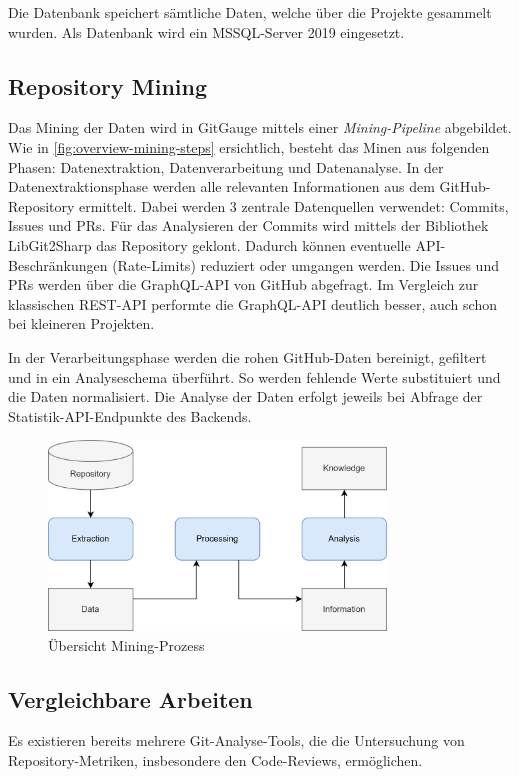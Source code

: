 Die Datenbank speichert sämtliche Daten, welche über die Projekte gesammelt wurden. Als Datenbank wird ein MSSQL-Server 2019 eingesetzt. \parencite{grand_joel_vt1_joelgrand_repository_2024}

\subsection{Repository Mining}
Das Mining der Daten wird in GitGauge mittels einer \textit{Mining-Pipeline} abgebildet. Wie in \autoref{fig:overview-mining-steps} ersichtlich, besteht das Minen aus folgenden Phasen: Datenextraktion, Datenverarbeitung und Datenanalyse. 
In der Datenextraktionsphase werden alle relevanten Informationen aus dem GitHub-Repository ermittelt. Dabei werden 3 zentrale Datenquellen verwendet: Commits, Issues und PRs. Für das Analysieren der Commits wird mittels der Bibliothek LibGit2Sharp das Repository geklont. Dadurch können eventuelle API-Beschränkungen (Rate-Limits) reduziert oder umgangen werden. Die Issues und PRs werden über die GraphQL-API von GitHub abgefragt. Im Vergleich zur klassischen REST-API performte die GraphQL-API deutlich besser, auch schon bei kleineren Projekten.  

In der Verarbeitungsphase werden die rohen GitHub-Daten bereinigt, gefiltert und in ein Analyseschema überführt. So werden fehlende Werte substituiert und die Daten normalisiert. 
Die Analyse der Daten erfolgt jeweils bei Abfrage der Statistik-API-Endpunkte des Backends. 

\begin{figure}[htbp]
    \centering
    \includegraphics[width=0.8\textwidth]{Figures/uebersicht-mining-prozess.png}
    \caption{Übersicht Mining-Prozess \parencite{grand_joel_vt1_joelgrand_repository_2024}}
    \label{fig:overview-mining-steps}
\end{figure}

\pagebreak
\subsection{Vergleichbare Arbeiten}
Es existieren bereits mehrere Git-Analyse-Tools, die die Untersuchung von Repository-Metriken, insbesondere den Code-Reviews, ermöglichen. 

